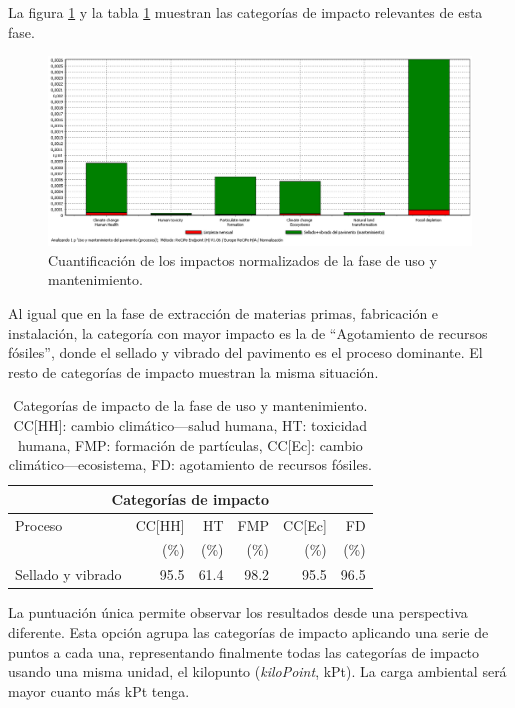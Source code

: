 La figura \ref{fig:uso_normalizacion} y la tabla \ref{categoriasimpactouso} muestran las categorías de impacto relevantes de esta fase.

\begin{figure}[!htb]
\centering
\includegraphics[width=15cm]{img/uso_normalizacion.png}
\caption{Cuantificación de los impactos normalizados de la fase de uso y mantenimiento.}
\label{fig:uso_normalizacion}
\end{figure}

Al igual que en la fase de extracción de materias primas, fabricación e instalación, la categoría con mayor impacto es la de ``Agotamiento de recursos fósiles'', donde el sellado y vibrado del pavimento es el proceso dominante. El resto de categorías de impacto muestran la misma situación.

\begin{table}[!htb]
\centering
\begin{tabular}{p{4cm}rrrrr}
\toprule
\multicolumn{6}{c}{Categorías de impacto}\\
\midrule
Proceso & CC[HH] & HT & FMP & CC[Ec] & FD\\
 &  (\%) & (\%) & (\%) & (\%) & (\%)\\
\midrule
Sellado y vibrado & 95.5 & 61.4 & 98.2 & 95.5 & 96.5\\
\bottomrule
\end{tabular}
\caption[Categorías de impacto de la fase de uso y mantenimiento.]{Categorías de impacto de la fase de uso y mantenimiento. CC[HH]: cambio climático—salud humana, HT: toxicidad humana, FMP: formación de partículas, CC[Ec]: cambio climático—ecosistema, FD: agotamiento de recursos fósiles.}
\label{categoriasimpactouso}
\end{table}

La puntuación única permite observar los resultados desde una perspectiva diferente. Esta opción agrupa las categorías de impacto aplicando una serie de puntos a cada una, representando finalmente todas las categorías de impacto usando una misma unidad, el kilopunto (\textit{kiloPoint}, kPt). La carga ambiental será mayor cuanto más kPt tenga.

